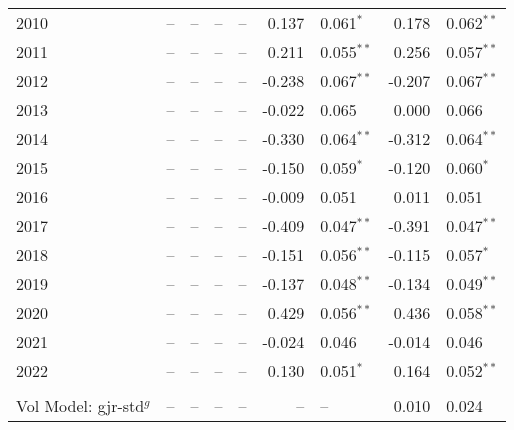 \documentclass[12pt]{report}
\begin{document}
\begin{table}
\begin{tabular}{l r l r l r l r l}
        2010                               &     -- & --            &      -- & --           &   0.137 & 0.061$^{*}$   &   0.178 & 0.062$^{**}$  \\
        2011                               &     -- & --            &      -- & --           &   0.211 & 0.055$^{**}$  &   0.256 & 0.057$^{**}$  \\
        2012                               &     -- & --            &      -- & --           &  -0.238 & 0.067$^{**}$  &  -0.207 & 0.067$^{**}$  \\
        2013                               &     -- & --            &      -- & --           &  -0.022 & 0.065         &   0.000 & 0.066         \\
        2014                               &     -- & --            &      -- & --           &  -0.330 & 0.064$^{**}$  &  -0.312 & 0.064$^{**}$  \\
        2015                               &     -- & --            &      -- & --           &  -0.150 & 0.059$^{*}$   &  -0.120 & 0.060$^{*}$   \\
        2016                               &     -- & --            &      -- & --           &  -0.009 & 0.051         &   0.011 & 0.051         \\
        2017                               &     -- & --            &      -- & --           &  -0.409 & 0.047$^{**}$  &  -0.391 & 0.047$^{**}$  \\
        2018                               &     -- & --            &      -- & --           &  -0.151 & 0.056$^{**}$  &  -0.115 & 0.057$^{*}$   \\
        2019                               &     -- & --            &      -- & --           &  -0.137 & 0.048$^{**}$  &  -0.134 & 0.049$^{**}$  \\
        2020                               &     -- & --            &      -- & --           &   0.429 & 0.056$^{**}$  &   0.436 & 0.058$^{**}$  \\
        2021                               &     -- & --            &      -- & --           &  -0.024 & 0.046         &  -0.014 & 0.046         \\
        2022                               &     -- & --            &      -- & --           &   0.130 & 0.051$^{*}$   &   0.164 & 0.052$^{**}$  \\  \\
        Vol Model: gjr-std$^{g}$           &     -- & --            &      -- & --           &      -- & --            &   0.010 & 0.024         \\

\end{tabular}
\end{table}
\end{document}
